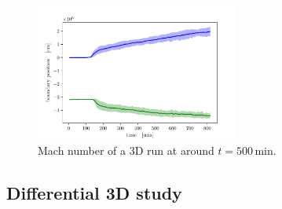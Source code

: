\begin{figure}[t!]
\centering
\includegraphics[width=0.6\textwidth]{./img/boundpos.pdf}
\caption{Mach number of a 3D run at around $t=500 \, \mathrm{min}$.}
\label{fig:3dmach}
\end{figure}
\subsection{Differential 3D study}
